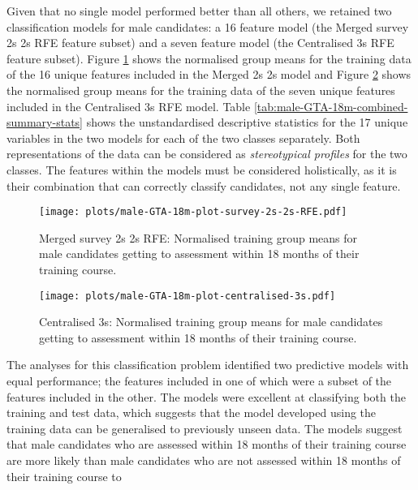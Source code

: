 \documentclass[
  12pt,
  a4paper,
]{book}
\begin{document}
Given that no single model performed better than all others, we retained two classification models for male candidates: a 16 feature model (the Merged survey 2s 2s RFE feature subset) and a seven feature model (the Centralised 3s RFE feature subset). Figure \ref{fig:male-GTA-18m-plot-survey-2s-2s-RFE} shows the normalised group means for the training data of the 16 unique features included in the Merged 2s 2s model and Figure \ref{fig:male-GTA-18m-plot-centralised-3s} shows the normalised group means for the training data of the seven unique features included in the Centralised 3s RFE model. Table \ref{tab:male-GTA-18m-combined-summary-stats} shows the unstandardised descriptive statistics for the 17 unique variables in the two models for each of the two classes separately. Both representations of the data can be considered as \emph{stereotypical profiles} for the two classes. The features within the models must be considered holistically, as it is their combination that can correctly classify candidates, not any single feature.

\begin{figure}
\centering
\texttt{[image: plots/male-GTA-18m-plot-survey-2s-2s-RFE.pdf]}
\caption{\label{fig:male-GTA-18m-plot-survey-2s-2s-RFE}Merged survey 2s 2s RFE: Normalised training group means for male candidates getting to assessment within 18 months of their training course.}
\end{figure}

\begin{figure}
\centering
\texttt{[image: plots/male-GTA-18m-plot-centralised-3s.pdf]}
\caption{\label{fig:male-GTA-18m-plot-centralised-3s}Centralised 3s: Normalised training group means for male candidates getting to assessment within 18 months of their training course.}
\end{figure}

The analyses for this classification problem identified two predictive models with equal performance; the features included in one of which were a subset of the features included in the other. The models were excellent at classifying both the training and test data, which suggests that the model developed using the training data can be generalised to previously unseen data. The models suggest that male candidates who are assessed within 18 months of their training course are more likely than male candidates who are not assessed within 18 months of their training course to
\end{document}
